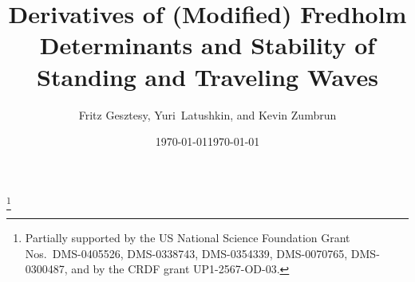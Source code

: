
\usepackage{amsmath,amsthm,amscd,amssymb,latexsym,upref}
\date{\today}

\allowdisplaybreaks
{}

\newtheorem{theorem}{Theorem}[section]

\newtheorem{theoremm}{Theorem}[section]
\newtheorem{lemma}[theorem]{Lemma}
\newtheorem{corollary}[theorem]{Corollary}
\newtheorem{hypothesis}[theorem]{Hypothesis}
\newtheorem{definition}[theorem]{Definition}
\newtheorem{example}[theorem]{Example}
\theoremstyle{definition}
\newtheorem{remark}[theorem]{Remark}
\newtheorem{fact}[theorem]{Fact}



\title[Derivatives of (Modified) Fredholm Determinants]
{Derivatives of (Modified) Fredholm Determinants and Stability of
Standing and Traveling Waves}
\author[F.\ Gesztesy, Yu.\ Latushkin, and
K.\ Zumbrun]{Fritz Gesztesy, Yuri\ Latushkin, and Kevin Zumbrun \hspace{80pt}}
\address{Department of Mathematics,
University of Missouri, Columbia, MO 65211, USA}
\address{Department of Mathematics,
University of Missouri, Columbia, MO 65211, USA}
\address{Mathematics Department, Indiana University,
Bloomington, IN 47405, USA}
\thanks{Partially supported by the US National Science
Foundation Grant Nos.\ DMS-0405526, DMS-0338743, DMS-0354339,
DMS-0070765, DMS-0300487, and by the CRDF grant UP1-2567-OD-03.}
\date{\today}

